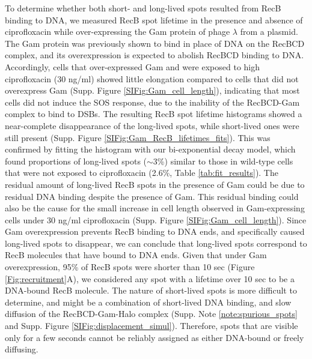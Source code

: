 To determine whether both short- and long-lived spots resulted from RecB binding to DNA, we measured RecB spot lifetime in the presence and absence of ciprofloxacin while over-expressing the Gam protein of phage $\lambda$ from a plasmid. The Gam protein was previously shown to bind in place of DNA on the RecBCD complex\cite{Wilkinson2016}, and its overexpression is expected to abolish RecBCD binding to DNA. Accordingly, cells that over-expressed Gam and were exposed to high ciprofloxacin (30 ng/ml) showed little elongation compared to cells that did not overexpress Gam (Supp. Figure \ref{SIFig:Gam_cell_length}), indicating that most cells did not induce the SOS response, due to the inability of the RecBCD-Gam complex to bind to DSBs. The resulting RecB spot lifetime histograms showed a near-complete disappearance of the long-lived spots, while short-lived ones were still present (Supp. Figure \ref{SIFig:Gam_RecB_lifetimes_fits}). This was confirmed by fitting the histogram with our bi-exponential decay model, which found proportions of long-lived spots ($\sim$3\%) similar to those in wild-type cells that were not exposed to ciprofloxacin (2.6\%, Table \ref{tab:fit_results}). The residual amount of long-lived RecB spots in the presence of Gam could be due to residual DNA binding despite the presence of Gam. This residual binding could also be the cause for the small increase in cell length observed in Gam-expressing cells under 30 ng/ml ciprofloxacin (Supp. Figure \ref{SIFig:Gam_cell_length}). Since Gam overexpression prevents RecB binding to DNA ends, and specifically caused long-lived spots to disappear, we can conclude that long-lived spots correspond to RecB molecules that have bound to DNA ends. Given that under Gam overexpression, 95\% of RecB spots were shorter than 10 sec (Figure \ref{Fig:recruitment}A), we considered any spot with a lifetime over 10 sec to be a DNA-bound RecB molecule. The nature of short-lived spots is more difficult to determine, and might be a combination of short-lived DNA binding, and slow diffusion of the RecBCD-Gam-Halo complex (Supp. Note \ref{note:spurious_spots} and Supp. Figure \ref{SIFig:displacement_simul}). Therefore, spots that are visible only for a few seconds cannot be reliably assigned as either DNA-bound or freely diffusing.

